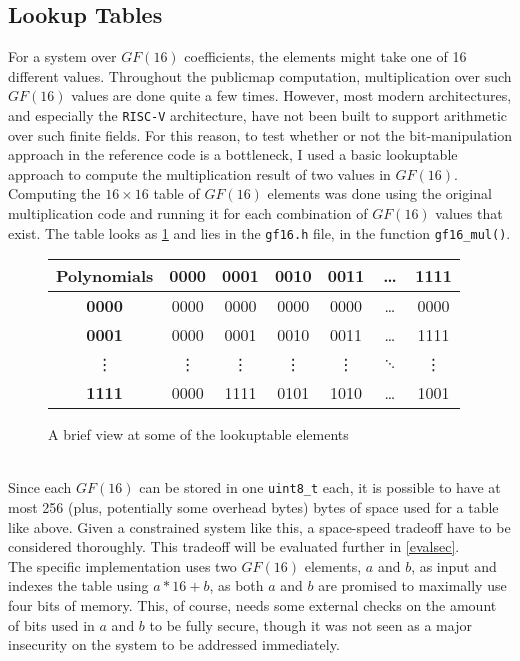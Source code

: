 \subsection{Lookup Tables} \label{opt:lookup}
For a system over $GF(16)$ coefficients, the elements might take one of 16 different values. Throughout the publicmap computation, multiplication over such $GF(16)$ values are done quite a few times. However, most modern architectures, and especially the \texttt{RISC-V} architecture, have not been built to support arithmetic over such finite fields. For this reason, to test whether or not the bit-manipulation approach in the reference code is a bottleneck, I used a basic lookuptable approach to compute the multiplication result of two values in $GF(16)$.\medskip\\
Computing the $16 \times 16$ table of $GF(16)$ elements was done using the original multiplication code and running it for each combination of $GF(16)$ values that exist. 
The table looks as \cref{lookuptable} and lies in the \texttt{gf16.h} file, in the function \texttt{gf16\_mul()}.
\begin{figure}[t]
    \centering
    \begin{tabular}{|c|c|c|c|c|c|c|}
        \hline
            \textbf{Polynomials} & \textbf{0000} & \textbf{0001} & \textbf{0010} & \textbf{0011} & \dots & \textbf{1111} \\
        \hline
            \textbf{0000} & 0000 & 0000 & 0000 & 0000 & \dots & 0000\\
        \hline
            \textbf{0001} & 0000 & 0001 & 0010 & 0011 & \dots & 1111\\
        \hline
            \vdots & \vdots & \vdots & \vdots & \vdots & $\ddots$ & \vdots\\
        \hline
            \textbf{1111} & 0000 & 1111 & 0101 & 1010 & \dots & 1001\\
        \hline
    \end{tabular}
    \caption{A brief view at some of the lookuptable elements}
    \label{lookuptable}
\end{figure}\\
Since each $GF(16)$ can be stored in one \texttt{uint8\_t} each, it is possible to have at most 256 (plus, potentially some overhead bytes) bytes of space used for a table like above. Given a constrained system like this, a space-speed tradeoff have to be considered thoroughly. This tradeoff will be evaluated further in \cref{evalsec}.\medskip\\
The specific implementation uses two $GF(16)$ elements, $a$ and $b$, as input and indexes the table using $a*16 + b$, as both $a$ and $b$ are promised to maximally use four bits of memory. This, of course, needs some external checks on the amount of bits used in $a$ and $b$ to be fully secure, though it was not seen as a major insecurity on the system to be addressed immediately.
